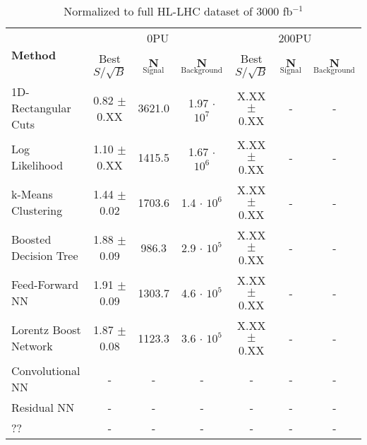 \documentclass{article}
\begin{document}
\begin{table}[h!]
  \hskip-4.0cm
    \begin{tabular}{|l|c|c|c|c|c|c|} %
      \hline\hline
      \multirow{2}{*}{\textbf{Method}} & \multicolumn{3}{c|}{0PU} & \multicolumn{3}{c|}{200PU}\\
      \cline{2-7}
      & Best $S/\sqrt{B}$ & \textbf{N$_{\mathrm{Signal}}$} & \textbf{N$_{\mathrm{Background}}$} & Best $S/\sqrt{B}$ & \textbf{N$_{\mathrm{Signal}}$} & \textbf{N$_{\mathrm{Background}}$}\\
      \hline
      1D-Rectangular Cuts   & 0.82 $\pm$ 0.XX & 3621.0 & 1.97 $\cdot$ $10^7$ & X.XX $\pm$ 0.XX & - & -\\
      Log Likelihood        & 1.10 $\pm$ 0.XX & 1415.5 & 1.67 $\cdot$ $10^6$ & X.XX $\pm$ 0.XX & - & - \\
      k-Means Clustering    & 1.44 $\pm$ 0.02 & 1703.6 & 1.4 $\cdot$ $10^6$ & X.XX $\pm$ 0.XX & - & - \\
      Boosted Decision Tree & 1.88 $\pm$ 0.09 & 986.3  & 2.9 $\cdot$ $10^5$ & X.XX $\pm$ 0.XX & - & - \\
      Feed-Forward NN       & 1.91 $\pm$ 0.09 & 1303.7 & 4.6 $\cdot$ $10^5$ & X.XX $\pm$ 0.XX & - & - \\
      Lorentz Boost Network & 1.87 $\pm$ 0.08 & 1123.3 & 3.6 $\cdot$ $10^5$ & X.XX $\pm$ 0.XX & - & - \\
      Convolutional NN & - & - & - & - & - & - \\                          
      Residual NN & - & - & - & - & - & - \\
      ?? & - & - & - & - & - & - \\
      \hline\hline
    \end{tabular}
    \caption{Normalized to full HL-LHC dataset of 3000 fb$^{-1}$}
\end{table}
\end{document}
